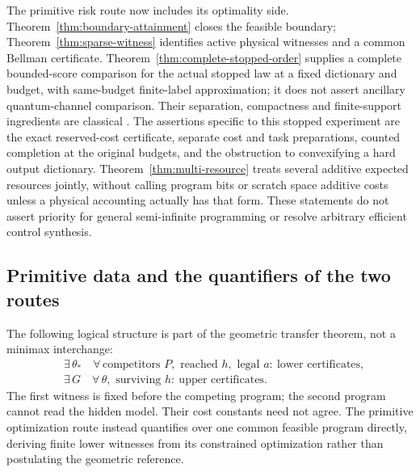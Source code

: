 The primitive risk route now includes its optimality side. Theorem~\ref{thm:boundary-attainment} closes the feasible boundary; Theorem~\ref{thm:sparse-witness} identifies active physical witnesses and a common Bellman certificate. Theorem~\ref{thm:complete-stopped-order} supplies a complete bounded-score comparison for the actual stopped law at a fixed dictionary and budget, with same-budget finite-label approximation; it does not assert ancillary quantum-channel comparison. Their separation, compactness and finite-support ingredients are classical \cite{Charnes63,Shapiro09,Balder89}. The assertions specific to this stopped experiment are the exact reserved-cost certificate, separate cost and task preparations, counted completion at the original budgets, and the obstruction to convexifying a hard output dictionary. Theorem~\ref{thm:multi-resource} treats several additive expected resources jointly, without calling program bits or scratch space additive costs unless a physical accounting actually has that form. These statements do not assert priority for general semi-infinite programming or resolve arbitrary efficient control synthesis.


\subsection*{Primitive data and the quantifiers of the two routes}
The following logical structure is part of the geometric transfer theorem, not a minimax interchange:
\[
\begin{aligned}
 &\exists\,\theta_*\quad\forall\,\text{competitors }P,\text{ reached }h,
                  \text{ legal }a:\ \text{lower certificates},\\
 &\exists\,G\quad\forall\,\theta,\text{ surviving }h:
                  \ \text{upper certificates}.
\end{aligned}
\]
The first witness is fixed before the competing program; the second program cannot read the hidden model. Their cost constants need not agree. The primitive optimization route instead quantifies over one common feasible program directly, deriving finite lower witnesses from its constrained optimization rather than postulating the geometric reference.

